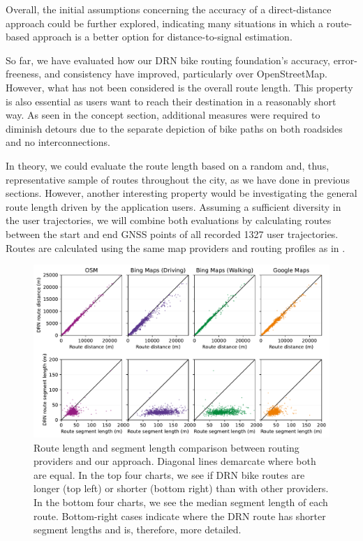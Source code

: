 Overall, the initial assumptions concerning the accuracy of a direct-distance approach could be further explored, indicating many situations in which a route-based approach is a better option for distance-to-signal estimation.

So far, we have evaluated how our DRN bike routing foundation's accuracy, error-freeness, and consistency have improved, particularly over OpenStreetMap. However, what has not been considered is the overall route length. This property is also essential as users want to reach their destination in a reasonably short way. As seen in the concept section, additional measures were required to diminish detours due to the separate depiction of bike paths on both roadsides and no interconnections. 

In theory, we could evaluate the route length based on a random and, thus, representative sample of routes throughout the city, as we have done in previous sections. However, another interesting property would be investigating the general route length driven by the application users. Assuming a sufficient diversity in the user trajectories, we will combine both evaluations by calculating routes between the start and end GNSS points of all recorded 1327 user trajectories. Routes are calculated using the same map providers and routing profiles as in .

\begin{figure}[t]
\centering 
\includegraphics[width=\linewidth]{images/routing-distance-comparison.pdf}
\caption{Route length and segment length comparison between routing providers and our approach. Diagonal lines demarcate where both are equal. In the top four charts, we see if DRN bike routes are longer (top left) or shorter (bottom right) than with other providers. In the bottom four charts, we see the median segment length of each route. Bottom-right cases indicate where the DRN route has shorter segment lengths and is, therefore, more detailed.}
\label{fig:routing-distance-comparison}
\end{figure}

